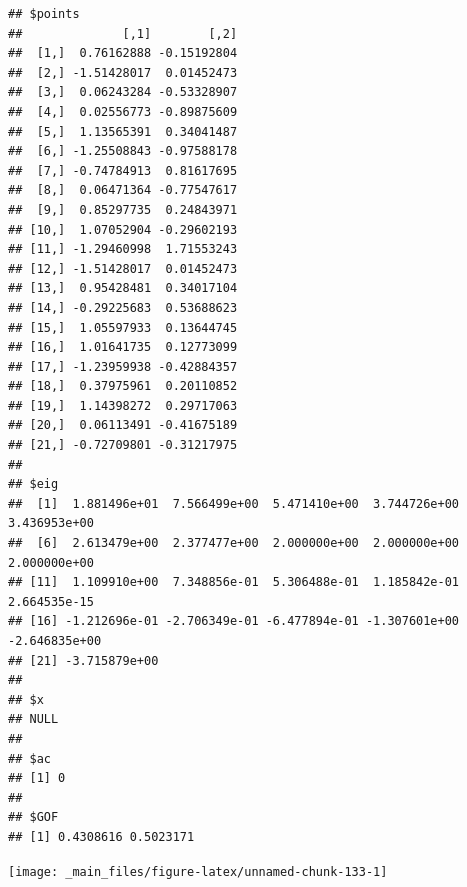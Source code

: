 \documentclass[
  notitlepage,
  onecolumn,
  openany]{book}
\newenvironment{Shaded}{\begin{snugshade}}{\end{snugshade}}
\newcommand{\AttributeTok}[1]{\textcolor[rgb]{0.77,0.63,0.00}{#1}}
\newcommand{\CommentTok}[1]{\textcolor[rgb]{0.56,0.35,0.01}{\textit{#1}}}
\newcommand{\DecValTok}[1]{\textcolor[rgb]{0.00,0.00,0.81}{#1}}
\newcommand{\FunctionTok}[1]{\textcolor[rgb]{0.00,0.00,0.00}{#1}}
\newcommand{\NormalTok}[1]{#1}
\newcommand{\SpecialCharTok}[1]{\textcolor[rgb]{0.00,0.00,0.00}{#1}}
\newcommand{\StringTok}[1]{\textcolor[rgb]{0.31,0.60,0.02}{#1}}
\begin{document}
\begin{verbatim}
## $points
##              [,1]        [,2]
##  [1,]  0.76162888 -0.15192804
##  [2,] -1.51428017  0.01452473
##  [3,]  0.06243284 -0.53328907
##  [4,]  0.02556773 -0.89875609
##  [5,]  1.13565391  0.34041487
##  [6,] -1.25508843 -0.97588178
##  [7,] -0.74784913  0.81617695
##  [8,]  0.06471364 -0.77547617
##  [9,]  0.85297735  0.24843971
## [10,]  1.07052904 -0.29602193
## [11,] -1.29460998  1.71553243
## [12,] -1.51428017  0.01452473
## [13,]  0.95428481  0.34017104
## [14,] -0.29225683  0.53688623
## [15,]  1.05597933  0.13644745
## [16,]  1.01641735  0.12773099
## [17,] -1.23959938 -0.42884357
## [18,]  0.37975961  0.20110852
## [19,]  1.14398272  0.29717063
## [20,]  0.06113491 -0.41675189
## [21,] -0.72709801 -0.31217975
## 
## $eig
##  [1]  1.881496e+01  7.566499e+00  5.471410e+00  3.744726e+00  3.436953e+00
##  [6]  2.613479e+00  2.377477e+00  2.000000e+00  2.000000e+00  2.000000e+00
## [11]  1.109910e+00  7.348856e-01  5.306488e-01  1.185842e-01  2.664535e-15
## [16] -1.212696e-01 -2.706349e-01 -6.477894e-01 -1.307601e+00 -2.646835e+00
## [21] -3.715879e+00
## 
## $x
## NULL
## 
## $ac
## [1] 0
## 
## $GOF
## [1] 0.4308616 0.5023171
\end{verbatim}

\begin{Shaded}
\end{Shaded}

\begin{center}\texttt{[image: \_main\_files/figure-latex/unnamed-chunk-133-1]} \end{center}
\end{document}
